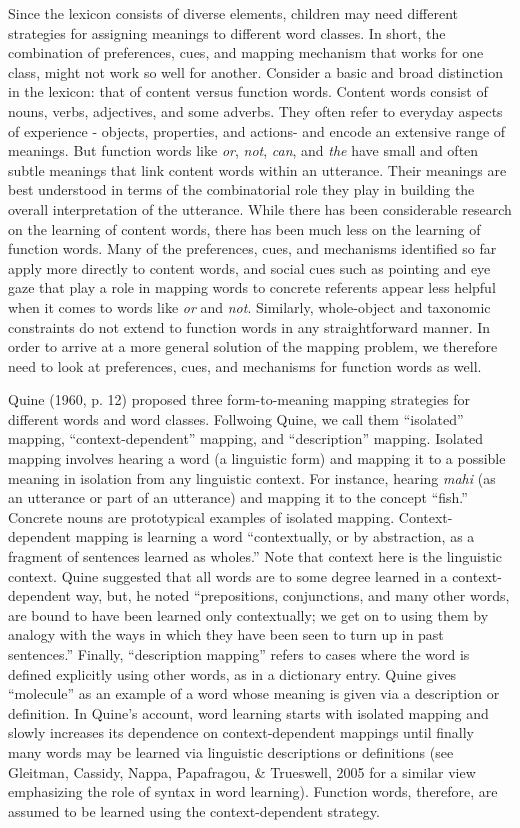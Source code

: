 \documentclass[
  english,
  ,man,floatsintext]{apa6}
\begin{document}
Since the lexicon consists of diverse elements, children may need different strategies for assigning meanings to different word classes. In short, the combination of preferences, cues, and mapping mechanism that works for one class, might not work so well for another. Consider a basic and broad distinction in the lexicon: that of content versus function words. Content words consist of nouns, verbs, adjectives, and some adverbs. They often refer to everyday aspects of experience - objects, properties, and actions- and encode an extensive range of meanings. But function words like \emph{or}, \emph{not}, \emph{can}, and \emph{the} have small and often subtle meanings that link content words within an utterance. Their meanings are best understood in terms of the combinatorial role they play in building the overall interpretation of the utterance. While there has been considerable research on the learning of content words, there has been much less on the learning of function words. Many of the preferences, cues, and mechanisms identified so far apply more directly to content words, and social cues such as pointing and eye gaze that play a role in mapping words to concrete referents appear less helpful when it comes to words like \emph{or} and \emph{not}. Similarly, whole-object and taxonomic constraints do not extend to function words in any straightforward manner. In order to arrive at a more general solution of the mapping problem, we therefore need to look at preferences, cues, and mechanisms for function words as well.

Quine (1960, p. 12) proposed three form-to-meaning mapping strategies for different words and word classes. Follwoing Quine, we call them ``isolated'' mapping, ``context-dependent'' mapping, and ``description'' mapping. Isolated mapping involves hearing a word (a linguistic form) and mapping it to a possible meaning in isolation from any linguistic context. For instance, hearing \emph{mahi} (as an utterance or part of an utterance) and mapping it to the concept ``fish.'' Concrete nouns are prototypical examples of isolated mapping. Context-dependent mapping is learning a word ``contextually, or by abstraction, as a fragment of sentences learned as wholes.'' Note that context here is the linguistic context. Quine suggested that all words are to some degree learned in a context-dependent way, but, he noted ``prepositions, conjunctions, and many other words, are bound to have been learned only contextually; we get on to using them by analogy with the ways in which they have been seen to turn up in past sentences.'' Finally, ``description mapping'' refers to cases where the word is defined explicitly using other words, as in a dictionary entry. Quine gives ``molecule'' as an example of a word whose meaning is given via a description or definition. In Quine's account, word learning starts with isolated mapping and slowly increases its dependence on context-dependent mappings until finally many words may be learned via linguistic descriptions or definitions (see Gleitman, Cassidy, Nappa, Papafragou, \& Trueswell, 2005 for a similar view emphasizing the role of syntax in word learning). Function words, therefore, are assumed to be learned using the context-dependent strategy.
\end{document}
